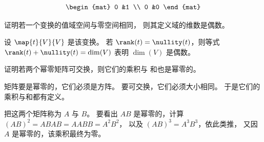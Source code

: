 \begin{exercises}
\begin{answer}
       \begin{equation*}
         \begin{mat}
           0  &1  \\
           0  &0
         \end{mat}
       \end{equation*}
     \end{answer}
   \recommended \item
     证明若一个变换的值域空间与零空间相同，
     则其定义域的维数是偶数。
     \begin{answer}
       设 $\map{t}{V}{V}$ 是该变换。
       若 \( \rank (t)=\nullity (t) \)，则等式
       \( \rank(t)+\nullity(t)=\dim (V) \) 表明
       \( \dim (V) \) 是偶数。
     \end{answer}
   \item
     证明若两个幂零矩阵可交换，则它们的乘积与
     和也是幂零的。
     \begin{answer}
       矩阵要是幂零的，它们必须是方阵。
       要可交换，它们必须大小相同。
       于是它们的乘积与和都有定义。

       把这两个矩阵称为 \( A \) 与 \( B \)。
       要看出 \( AB \) 是幂零的，计算
       $
          (AB)^2=ABAB=AABB=A^2B^2$，
       以及
          $(AB)^3=A^3B^3$，依此类推，
       又因 \( A \) 是幂零的，该乘积最终为零。


\end{answer}
\end{exercises}
